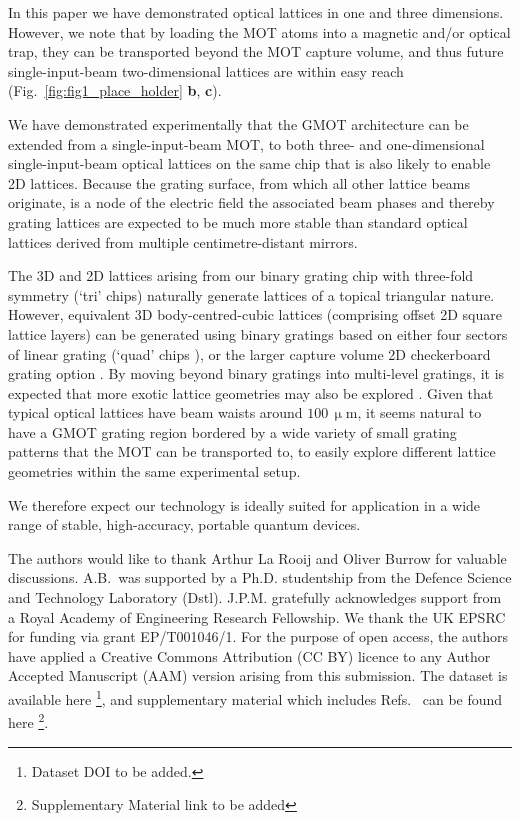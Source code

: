 \documentclass[aps,prl,floatfix,showpacs,twocolumn,amsmath,amssymb,superscriptaddress]{revtex4-2}
\begin{document}
In this paper we have demonstrated optical lattices in one and three dimensions. However, we note that by loading the MOT atoms into a magnetic and/or optical trap, they can be transported beyond the MOT capture volume, and thus future single-input-beam two-dimensional lattices are within easy reach (Fig.~\ref{fig:fig1_place_holder} \textbf{b}, \textbf{c}).

We have demonstrated experimentally that the GMOT architecture can be extended from a single-input-beam MOT, to both three- and one-dimensional single-input-beam optical lattices on the same chip that is also likely to enable 2D lattices. Because the grating surface, from which all other lattice beams originate, is a node of the electric field the associated beam phases and thereby grating lattices are expected to be much more stable than standard optical lattices derived from multiple centimetre-distant mirrors.

The 3D and 2D lattices arising from our binary grating chip with three-fold symmetry (`tri' chips) naturally generate lattices of a topical \cite{Struck2011,Xu2023,Mongkolkiattichai2023} triangular nature. However, equivalent 3D body-centred-cubic lattices (comprising offset 2D square lattice layers) can be generated using binary gratings based on either four sectors of linear grating (`quad' chips \cite{GMOT1_Nshii2013,Imhof2017,Burrow2021}), or the larger capture volume 2D checkerboard grating option \cite{GMOT1_Nshii2013}. By moving beyond binary gratings into multi-level gratings, it is expected that more exotic lattice geometries may  also be explored \cite{Viebahn2019,Wintersperger2020,Leung2020}. Given that typical optical lattices have beam waists around $100\,\upmu$m, it seems natural to have a GMOT grating region bordered by a wide variety of small grating patterns that the MOT can be transported to, to easily explore different lattice geometries within the same experimental setup.

We therefore expect our technology is ideally suited for application in a wide range of stable, high-accuracy, portable quantum devices.

\begin{acknowledgments}
The authors would like to thank Arthur La Rooij and Oliver Burrow for valuable discussions.
A.B.\ was supported by a Ph.D. studentship from the Defence Science and Technology Laboratory (Dstl). J.P.M. gratefully acknowledges support from a Royal Academy of Engineering Research Fellowship. We thank the UK EPSRC for funding via grant EP/T001046/1. For the purpose of open access, the
authors have applied a Creative Commons Attribution (CC BY)
licence to any Author Accepted Manuscript (AAM) version
arising from this submission. The dataset is available here \footnote{Dataset DOI to be added.}, and supplementary material which includes Refs.~\cite{Vangeleyn2010,Henderson2020,Arnold2000} can be found here \footnote{Supplementary Material link to be added}.
\end{acknowledgments}


\end{document}
